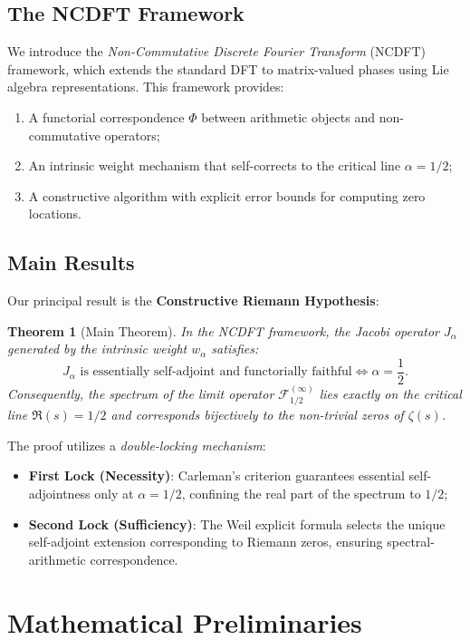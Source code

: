 \documentclass[12pt,a4paper]{article}
\theoremstyle{definition}
\theoremstyle{plain}
\newtheorem{theorem}{Theorem}[section]
\theoremstyle{remark}
\newcommand{\F}{\mathcal{F}}
\begin{document}
\subsection{The NCDFT Framework}
We introduce the \textit{Non-Commutative Discrete Fourier Transform} (NCDFT) framework, which extends the standard DFT to matrix-valued phases using Lie algebra representations. This framework provides:
\begin{enumerate}
    \item A functorial correspondence $\Phi$ between arithmetic objects and non-commutative operators;
    \item An intrinsic weight mechanism that self-corrects to the critical line $\alpha = 1/2$;
    \item A constructive algorithm with explicit error bounds for computing zero locations.
\end{enumerate}

\subsection{Main Results}
Our principal result is the \textbf{Constructive Riemann Hypothesis}:

\begin{theorem}[Main Theorem]\label{thm:main}
In the NCDFT framework, the Jacobi operator $J_\alpha$ generated by the intrinsic weight $w_\alpha$ satisfies:
\[
J_\alpha \text{ is essentially self-adjoint and functorially faithful} \iff \alpha = \frac{1}{2}.
\]
Consequently, the spectrum of the limit operator $\F_{1/2}^{(\infty)}$ lies exactly on the critical line $\Re(s) = 1/2$ and corresponds bijectively to the non-trivial zeros of $\zeta(s)$.
\end{theorem}

The proof utilizes a \textit{double-locking mechanism}:
\begin{itemize}
    \item \textbf{First Lock (Necessity)}: Carleman's criterion guarantees essential self-adjointness only at $\alpha = 1/2$, confining the real part of the spectrum to $1/2$;
    \item \textbf{Second Lock (Sufficiency)}: The Weil explicit formula selects the unique self-adjoint extension corresponding to Riemann zeros, ensuring spectral-arithmetic correspondence.
\end{itemize}

\section{Mathematical Preliminaries}
\end{document}
